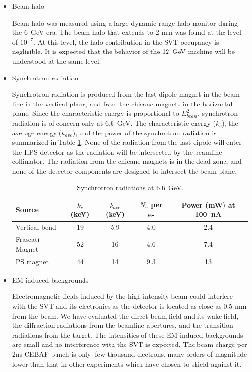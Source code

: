 \begin{itemize}
\item
Beam halo

Beam halo was measured using a large dynamic range halo monitor during the 6~GeV era. The beam halo 
that extends to 2 mm was found at the level of $10^{-7}$. At this level, the halo contribution in 
the SVT occupancy is negligible. It is expected that the behavior of the 12~GeV machine will be
understood at the same level.

\item
Synchrotron radiation

Synchrotron radiation is produced from the last dipole magnet in the beam line in the vertical 
plane, and from the chicane magnets in the horizontal plane. Since the characteristic energy is 
proportional to $E_{beam}^2$, synchrotron radiation is of concern 
only at 6.6~GeV. The characteristic energy ($k_c$),
the average energy ($k_{ave}$), and the power of the synchrotron radiation is summarized in 
Table \ref{tab:sync}.
None of the radiation from the last dipole will enter the HPS detector as the radiation will be intersected 
by the beamline collimator. The radiation from the chicane magnets is in the dead zone, and
none of the detector components are designed to intersect the beam plane.   

\begin{table}[h]
\begin{center}
\begin{tabular}{|l|c|c|c|c|} \hline
  Source & $k_c$ (keV) & $k_{ave}$ (keV) & $N_\gamma$ per e- & Power (mW) at 100~nA \\ \hline
  Vertical bend & 19 & 5.9 & 4.0 & 2.4 \\ \hline
  Frascati Magnet & 52 & 16 & 4.6 & 7.4 \\ \hline
  PS magnet   & 44 & 14 & 9.3 & 13 \\ \hline
\end{tabular}
\end{center}
\caption{\small{Synchrotron radiations at 6.6~GeV.}}
\label{tab:sync}
\end{table}


\item
EM induced backgrounds

Electromagnetic fields induced by the high intensity beam could interfere with the SVT and its electronics
as the detector is located as close as 0.5 mm from the beam. We have evaluated the direct beam field and its wake 
field, the diffraction radiations from the beamline apertures, and the transition radiations from
the target. The intensities of these EM induced backgrounds are small and no interference with the SVT is expected. The beam charge per 2ns CEBAF bunch is only $~$few thousand electrons, many orders of magnitude lower than that in other experiments which have chosen to shield against it.
 
\end{itemize}

